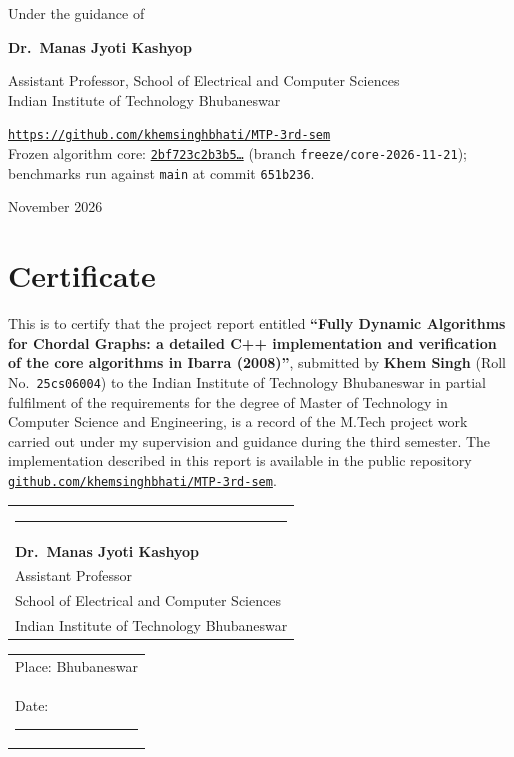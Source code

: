 \documentclass[11pt,a4paper,oneside]{report}
\theoremstyle{plain}
\theoremstyle{definition}
\theoremstyle{remark}
\newcommand{\repo}{\href{https://github.com/khemsinghbhati/MTP-3rd-sem}{\nolinkurl{github.com/khemsinghbhati/MTP-3rd-sem}}}
\begin{document}
\begin{titlepage}
{\normalsize Under the guidance of\par}
\vspace{1mm}
{\LARGE\bfseries Dr.\ Manas Jyoti Kashyop\par}
\vspace{1mm}
{\normalsize Assistant Professor, School of Electrical and Computer Sciences\\
Indian Institute of Technology Bhubaneswar\par}
\vspace{10mm}
\begin{tcolorbox}[enhanced,colback=accentlight!60,colframe=accent,boxrule=1pt,
  width=0.9\textwidth,halign=center,title={\centering Complete source code, tests, benchmarks and data},
  fonttitle=\bfseries\normalsize,coltitle=white]
{\large \href{https://github.com/khemsinghbhati/MTP-3rd-sem}{\nolinkurl{https://github.com/khemsinghbhati/MTP-3rd-sem}}}\\[1mm]
{\small Frozen algorithm core: \href{https://github.com/khemsinghbhati/MTP-3rd-sem/tree/2bf723c2b3b57a6b532058f21742b8125292852a}{\texttt{2bf723c2b3b5\ldots}} (branch \texttt{freeze/core-2026-11-21});\\
benchmarks run against \texttt{main} at commit \texttt{651b236}.}
\end{tcolorbox}
\vfill
{\large November 2026\par}
\restoregeometry
\end{titlepage}
\hypersetup{pageanchor=true}

\chapter*{Certificate}
\thispagestyle{plain}
\noindent This is to certify that the project report entitled
\textbf{``Fully Dynamic Algorithms for Chordal Graphs: a detailed C++
implementation and verification of the core algorithms in Ibarra (2008)''}, submitted by \textbf{Khem Singh} (Roll No.\ \texttt{25cs06004})
to the Indian Institute of Technology Bhubaneswar in partial fulfilment of the requirements for
the degree of Master of Technology in Computer Science and Engineering, is a record of the
M.Tech project work carried out under my supervision and guidance during the third semester.
The implementation described in this report is available in the public repository
\repo.

\vspace{30mm}
\noindent\begin{tabular}{@{}l@{}}
\rule{65mm}{0.4pt}\\
\textbf{Dr.\ Manas Jyoti Kashyop}\\
Assistant Professor\\
School of Electrical and Computer Sciences\\
Indian Institute of Technology Bhubaneswar
\end{tabular}
\hfill
\begin{tabular}{@{}l@{}}
Place: Bhubaneswar\\
Date: \rule{34mm}{0.4pt}
\end{tabular}
\end{document}
